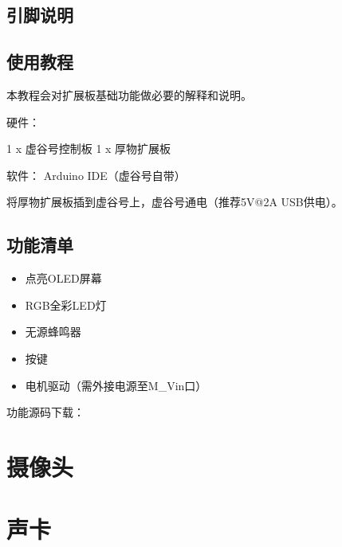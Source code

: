\documentclass[letterpaper,10pt,english]{sphinxmanual}
\begin{document}
\subsection{引脚说明}
\label{\detokenize{07.plus/7.1-houwu:id5}}
\noindent{}

\noindent{}


\subsection{使用教程}
\label{\detokenize{07.plus/7.1-houwu:id6}}
本教程会对扩展板基础功能做必要的解释和说明。


硬件：

1 x 虚谷号控制板
1 x 厚物扩展板

软件：
Arduino IDE（虚谷号自带）

将厚物扩展板插到虚谷号上，虚谷号通电（推荐5V@2A USB供电）。


\subsection{功能清单}
\label{\detokenize{07.plus/7.1-houwu:id7}}\begin{itemize}
\item {} 
点亮OLED屏幕

\item {} 
RGB全彩LED灯

\item {} 
无源蜂鸣器

\item {} 
按键

\item {} 
电机驱动（需外接电源至M\_Vin口）

\end{itemize}

功能源码下载：


\section{摄像头}
\label{\detokenize{07.plus/7.2::doc}}\label{\detokenize{07.plus/7.2:id1}}

\section{声卡}
\label{\detokenize{07.plus/7.3::doc}}\label{\detokenize{07.plus/7.3:id1}}
\end{document}
